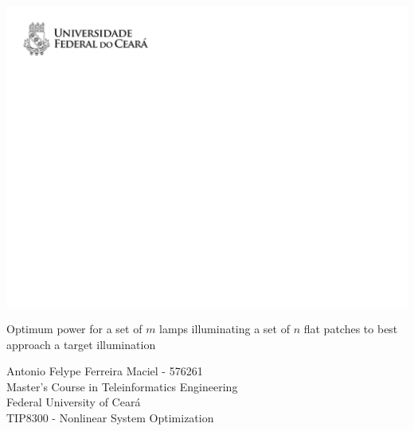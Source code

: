 \documentclass[11pt,a4paper]{article}
\begin{document}
\thispagestyle{empty}

\begin{flushleft} \includegraphics[width=1.0\textwidth]{headers}   \end{flushleft}

\vskip0.5cm
\begin{spacing}{2} {\Large\sc\noindent Optimum power for a set of $m$ lamps illuminating a set of $n$ flat patches to best approach a target illumination}
\end{spacing}

\vfill

\begin{spacing}{1.2}
{\large\sc  Antonio Felype Ferreira Maciel - 576261}\\

{\noindent \large \sc Master's Course in Teleinformatics Engineering}\\
{\noindent \large \sc Federal University of Ceará}\\

{\noindent \large \sc TIP8300 - Nonlinear System Optimization}
\end{spacing}

\newpage 

\tableofcontents

\newpage

\end{document}

